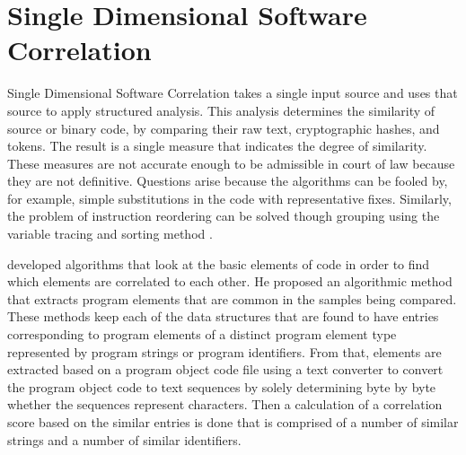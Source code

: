 \documentclass[12pt]{report}
\begin{document}
\section{Single Dimensional Software Correlation}
Single Dimensional Software Correlation takes a single input source and uses that source to apply structured analysis.  This analysis determines the similarity of source or binary code, by comparing their raw text, cryptographic hashes, and tokens.  The result is a single measure that indicates the degree of similarity.  These measures are not accurate enough to be admissible in court of law because they are not definitive.  Questions arise because the algorithms can be fooled by, for example, simple substitutions in the code with representative fixes.  Similarly, the problem of instruction reordering can be solved though grouping using the variable tracing and sorting method \cite{oh2009fight}.

\cite{zeidman2012detecting} developed algorithms that look at the basic elements of code in order to find which elements are correlated to each other.  He proposed an algorithmic method that extracts program elements that are common in the samples being compared.  These methods keep each of the data structures that are found to have entries corresponding to program elements of a distinct program element type represented by program strings or program identifiers.   From that, elements are extracted based on a program object code file using a text converter to convert the program object code to text sequences by solely determining byte by byte whether the sequences represent characters.  Then a calculation of a correlation score based on the similar entries is done that is comprised of a number of similar strings and a number of similar identifiers.

\end{document}
